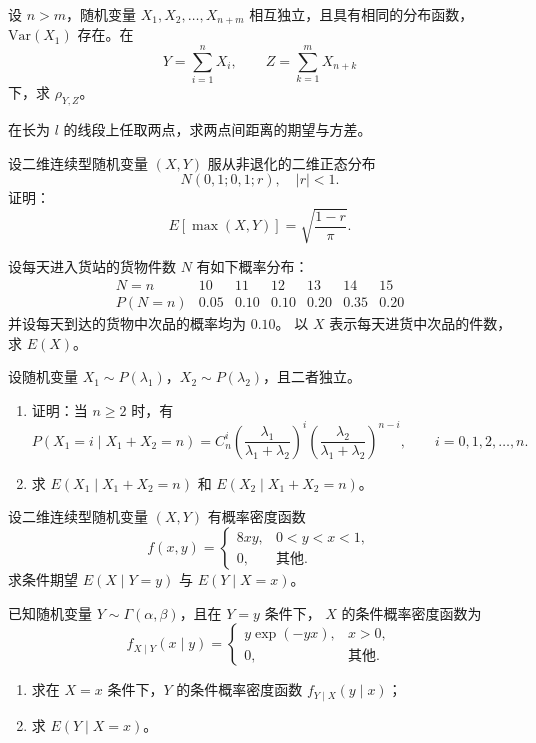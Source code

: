 \begin{homework}[3.34]
设 $n>m$，随机变量 $X_1,X_2,\ldots,X_{n+m}$ 相互独立，且具有相同的分布函数，
$\mathrm{Var}(X_1)$ 存在。在
\[
Y=\sum_{i=1}^{n} X_i,\qquad Z=\sum_{k=1}^{m} X_{n+k}
\]
下，求 $\rho_{Y,Z}$。
\end{homework}

\begin{homework}[3.35]
在长为 $l$ 的线段上任取两点，求两点间距离的期望与方差。
\end{homework}

\begin{homework}[3.36]
设二维连续型随机变量 $(X,Y)$ 服从非退化的二维正态分布
\[
N(0,1;0,1;r),\quad |r|<1.
\]
证明：
\[
E[\max(X,Y)] = \sqrt{\frac{1-r}{\pi}}.
\]
\end{homework}

\begin{homework}[3.37]
设每天进入货站的货物件数 $N$ 有如下概率分布：
\[
\begin{array}{c|cccccc}
N=n & 10 & 11 & 12 & 13 & 14 & 15 \\ \hline
P(N=n) & 0.05 & 0.10 & 0.10 & 0.20 & 0.35 & 0.20
\end{array}
\]
并设每天到达的货物中次品的概率均为 $0.10$。
以 $X$ 表示每天进货中次品的件数，求 $E(X)$。
\end{homework}

\begin{homework}[3.38]
设随机变量 $X_1 \sim P(\lambda_1)$，$X_2 \sim P(\lambda_2)$，且二者独立。

\begin{enumerate}[(1)]
  \item 证明：当 $n \ge 2$ 时，有
  \[
  P(X_1=i \mid X_1+X_2=n)
  = C_n^i
    \left(\frac{\lambda_1}{\lambda_1+\lambda_2}\right)^i
    \left(\frac{\lambda_2}{\lambda_1+\lambda_2}\right)^{n-i},
  \qquad i=0,1,2,\ldots,n.
  \]
  \item 求 $E(X_1\mid X_1+X_2=n)$ 和 $E(X_2\mid X_1+X_2=n)$。
\end{enumerate}
\end{homework}

\begin{homework}[3.39]
设二维连续型随机变量 $(X,Y)$ 有概率密度函数
\[
f(x,y)=
\begin{cases}
8xy, & 0<y<x<1,\\[4pt]
0, & \text{其他}.
\end{cases}
\]
求条件期望 $E(X\mid Y=y)$ 与 $E(Y\mid X=x)$。
\end{homework}

\begin{homework}[3.40]
已知随机变量 $Y\sim \Gamma(\alpha,\beta)$，且在 $Y=y$ 条件下，
$X$ 的条件概率密度函数为
\[
f_{X\mid Y}(x\mid y)=
\begin{cases}
y\exp(-yx), & x>0,\\[4pt]
0, & \text{其他}.
\end{cases}
\]
\begin{enumerate}[(1)]
  \item 求在 $X=x$ 条件下，$Y$ 的条件概率密度函数 $f_{Y\mid X}(y\mid x)$；
  \item 求 $E(Y\mid X=x)$。
\end{enumerate}
\end{homework}